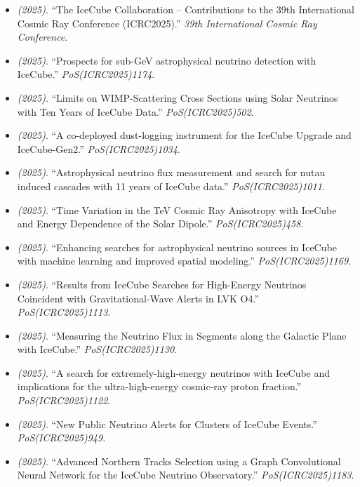 \begin{itemize}
\item \textit{(2025)}. ``The IceCube Collaboration -- Contributions to the 39th International Cosmic Ray Conference (ICRC2025).'' \textit{39th International Cosmic Ray Conference}. 
\item \textit{(2025)}. ``Prospects for sub-GeV astrophysical neutrino detection with IceCube.'' \textit{PoS(ICRC2025)1174}.  
\item \textit{(2025)}. ``Limits on WIMP-Scattering Cross Sections using Solar Neutrinos with Ten Years of IceCube Data.'' \textit{PoS(ICRC2025)502}.  
\item \textit{(2025)}. ``A co-deployed dust-logging instrument for the IceCube Upgrade and IceCube-Gen2.'' \textit{PoS(ICRC2025)1034}.  
\item \textit{(2025)}. ``Astrophysical neutrino flux measurement and search for nutau induced cascades with 11 years of IceCube data.'' \textit{PoS(ICRC2025)1011}.  
\item \textit{(2025)}. ``Time Variation in the TeV Cosmic Ray Anisotropy with IceCube and Energy Dependence of the Solar Dipole.'' \textit{PoS(ICRC2025)458}.  
\item \textit{(2025)}. ``Enhancing searches for astrophysical neutrino sources in IceCube with machine learning and improved spatial modeling.'' \textit{PoS(ICRC2025)1169}.  
\item \textit{(2025)}. ``Results from IceCube Searches for High-Energy Neutrinos Coincident with Gravitational-Wave Alerts in LVK O4.'' \textit{PoS(ICRC2025)1113}.  
\item \textit{(2025)}. ``Measuring the Neutrino Flux in Segments along the Galactic Plane with IceCube.'' \textit{PoS(ICRC2025)1130}.  
\item \textit{(2025)}. ``A search for extremely-high-energy neutrinos with IceCube and implications for the ultra-high-energy cosmic-ray proton fraction.'' \textit{PoS(ICRC2025)1122}.  
\item \textit{(2025)}. ``New Public Neutrino Alerts for Clusters of IceCube Events.'' \textit{PoS(ICRC2025)949}.  
\item \textit{(2025)}. ``Advanced Northern Tracks Selection using a Graph Convolutional Neural Network for the IceCube Neutrino Observatory.'' \textit{PoS(ICRC2025)1183}.  

\end{itemize}
